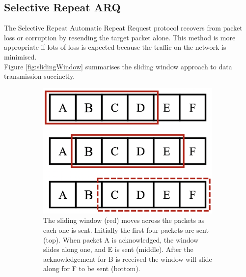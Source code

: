 \subsection{Selective Repeat ARQ}
\indent \indent
The Selective Repeat Automatic Repeat Request protocol recovers from packet loss or corruption by resending the target packet alone. This method is more appropriate if lots of loss is expected because the traffic on the network is minimised. 
\smallskip \\ \indent
Figure \ref{fig:slidingWindow} summarises the sliding window approach to data transmission succinctly.
\begin{figure}[htp]
    \begin{subfigure}[b]{0.45\textwidth}
        \centering
        \includegraphics[scale=0.25]{figures/slidingWindow1}
        \caption{The sliding window (red) moves across the packets as each one is sent. Initially the first four packets are sent (top). When packet A is acknowledged, the window slides along one, and E is sent (middle). After the acknowledgement for B is received the window will slide along for F to be sent (bottom).}
    \end{subfigure}\hfill%
    \begin{subfigure}[b]{0.45\textwidth}
        \centering

\end{subfigure}
\end{figure}
